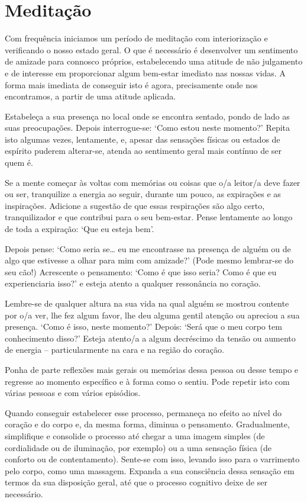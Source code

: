 
\chapter{Meditação}


Com frequência iniciamos um período de meditação com interiorização e
verificando o nosso estado geral. O que é necessário é desenvolver um sentimento
de amizade para connosco próprios, estabelecendo uma atitude de não julgamento e
de interesse em proporcionar algum bem-estar imediato nas nossas vidas. A forma
mais imediata de conseguir isto é agora, precisamente onde nos encontramos, a
partir de uma atitude aplicada.

Estabeleça a sua presença no local onde se encontra sentado, pondo de lado as
suas preocupações. Depois interrogue-se: `Como estou neste momento?' Repita isto
algumas vezes, lentamente, e, apesar das sensações físicas ou estados de
espírito puderem alterar-se, atenda ao sentimento geral mais contínuo de ser
quem é.

Se a mente começar às voltas com memórias ou coisas que o/a leitor/a deve fazer
ou ser, tranquilize a energia ao seguir, durante um pouco, as expirações e as
inspirações. Adicione a sugestão de que essas respirações são algo certo,
\mbox{tranquilizador} e que contribui para o seu bem-estar. Pense lentamente ao longo
de toda a expiração: `Que eu esteja bem'.

Depois pense: `Como seria se\ldots{} eu me encontrasse na presença de alguém ou de
algo que estivesse a olhar para mim com amizade?' (Pode mesmo lembrar-se do seu
cão!) Acrescente o pensamento: `Como é que isso seria? Como é que eu
experienciaria isso?' e esteja atento a qualquer ressonância no coração.

Lembre-se de qualquer altura na sua vida na qual alguém se mostrou contente por
o/a ver, lhe fez algum favor, lhe deu alguma gentil atenção ou apreciou a sua
presença. `Como é isso, neste momento?' Depois: `Será que o meu corpo tem
conhecimento disso?' Esteja atento/a a algum decréscimo da tensão ou aumento de
energia -- particularmente na cara e na região do coração.

Ponha de parte reflexões mais gerais ou memórias dessa pessoa ou desse tempo e
regresse ao momento específico e à forma como o sentiu. Pode repetir isto com
várias pessoas e com vários episódios.

Quando conseguir estabelecer esse processo, permaneça no efeito ao nível do
coração e do corpo e, da mesma forma, diminua o pensamento. Gradualmente,
simplifique e consolide o processo até chegar a uma imagem simples (de
cordialidade ou de iluminação, por exemplo) ou a uma sensação física (de
conforto ou de contentamento). Sente-se com isso, levando isso para o varrimento
pelo corpo, como uma massagem. Expanda a sua consciência dessa sensação em
termos da sua disposição geral, até que o processo cognitivo deixe de ser
necessário.


